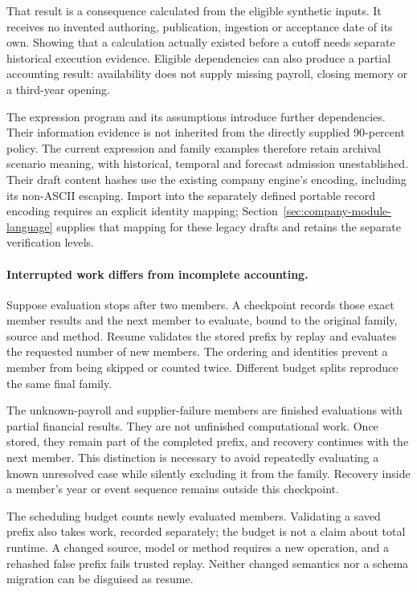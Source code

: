 That result is a consequence calculated from the eligible synthetic inputs.
It receives no invented authoring, publication, ingestion or acceptance date
of its own. Showing that a calculation actually existed before a cutoff needs
separate historical execution evidence. Eligible dependencies can also produce
a partial accounting result: availability does not supply missing payroll,
closing memory or a third-year opening.

The expression program and its assumptions introduce further dependencies.
Their information evidence is not inherited from the directly supplied
90-percent policy. The current expression and family examples therefore retain
archival scenario meaning, with historical, temporal and forecast admission
unestablished. Their draft content hashes use the existing company engine's
encoding, including its non-ASCII escaping. Import into the separately defined
portable record encoding requires an explicit identity mapping;
Section~\ref{sec:company-module-language} supplies that mapping for these
legacy drafts and retains the separate verification levels.

\paragraph{Interrupted work differs from incomplete accounting.}
Suppose evaluation stops after two members. A checkpoint records those exact
member results and the next member to evaluate, bound to the original family,
source and method. Resume validates the stored prefix by replay and evaluates
the requested number of new members. The ordering and identities prevent a
member from being skipped or counted twice. Different budget splits reproduce
the same final family.

The unknown-payroll and supplier-failure members are finished evaluations with
partial financial results. They are not unfinished computational work. Once
stored, they remain part of the completed prefix, and recovery continues with
the next member. This distinction is necessary to avoid repeatedly evaluating
a known unresolved case while silently excluding it from the family. Recovery
inside a member's year or event sequence remains outside this checkpoint.

The scheduling budget counts newly evaluated members. Validating a saved
prefix also takes work, recorded separately; the budget is not a claim about
total runtime. A changed source, model or method requires a new operation,
and a rehashed false prefix fails trusted replay. Neither changed semantics
nor a schema migration can be disguised as resume.

